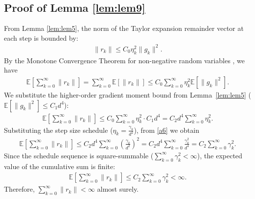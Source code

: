 \documentclass[11pt,a4paper]{article}
\theoremstyle{definition}
\begin{document}
\subsection{Proof of Lemma \ref{lem:lem9}}
From Lemma \ref{lem:lem5}, the norm of the Taylor expansion remainder vector at each step is bounded by:
\begin{align}
\|r_k\| \le C_0 \eta_k^2 \|g_k\|^2.
\end{align}
By the Monotone Convergence Theorem for non-negative random variables \cite{Billingsley}, we have
\begin{align}
\mathbb{E}\left[ \sum_{k=0}^{\infty} \|r_k\| \right] = \sum_{k=0}^{\infty} \mathbb{E}[\|r_k\|] \le C_0 \sum_{k=0}^{\infty} \eta_k^2 \mathbb{E}[\|g_k\|^2].
\end{align}
We substitute the higher-order gradient moment bound from Lemma~\ref{lem:lem5} ($\mathbb{E}[\|g_k\|^2] \le C_1 d^4$):
\begin{align}
\mathbb{E}\left[ \sum_{k=0}^{\infty} \|r_k\| \right] \le C_0 \sum_{k=0}^{\infty} \eta_k^2 \cdot C_1 d^4 = C_2 d^4 \sum_{k=0}^{\infty} \eta_k^2 \label{a6}.
\end{align}
Substituting the step size schedule ($\eta_k = \frac{\gamma_k}{d^2}$), from \eqref{a6} we obtain
\begin{align}
\mathbb{E}\left[ \sum_{k=0}^{\infty} \|r_k\| \right] \le C_2 d^4 \sum_{k=0}^{\infty} \left( \frac{\gamma_k}{d^2} \right)^2 = C_2 d^4 \sum_{k=0}^{\infty} \frac{\gamma_k^2}{d^4} = C_2 \sum_{k=0}^{\infty} \gamma_k^2.
\end{align}
Since the schedule sequence is square-summable ($\sum_{k=0}^{\infty} \gamma_k^2 < \infty$), the expected value of the cumulative sum is finite:
\begin{align}
\mathbb{E}\left[ \sum_{k=0}^{\infty} \|r_k\| \right] \le C_2 \sum_{k=0}^{\infty} \gamma_k^2 < \infty.
\end{align}
Therefore, $\sum_{k=0}^{\infty} \|r_k\| < \infty$ almost surely.


\end{document}
